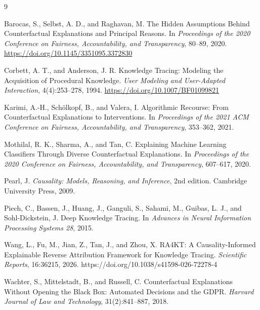 \documentclass[11pt]{article}
\begin{document}
\begin{thebibliography}{9}
\setlength{\itemsep}{4pt}

Barocas, S., Selbst, A. D., and Raghavan, M. The Hidden Assumptions Behind Counterfactual Explanations and Principal Reasons. In \emph{Proceedings of the 2020 Conference on Fairness, Accountability, and Transparency}, 80--89, 2020. \url{https://doi.org/10.1145/3351095.3372830}

Corbett, A. T., and Anderson, J. R. Knowledge Tracing: Modeling the Acquisition of Procedural Knowledge. \emph{User Modeling and User-Adapted Interaction}, 4(4):253--278, 1994. \url{https://doi.org/10.1007/BF01099821}

Karimi, A.-H., Sch\"olkopf, B., and Valera, I. Algorithmic Recourse: From Counterfactual Explanations to Interventions. In \emph{Proceedings of the 2021 ACM Conference on Fairness, Accountability, and Transparency}, 353--362, 2021.

Mothilal, R. K., Sharma, A., and Tan, C. Explaining Machine Learning Classifiers Through Diverse Counterfactual Explanations. In \emph{Proceedings of the 2020 Conference on Fairness, Accountability, and Transparency}, 607--617, 2020.

Pearl, J. \emph{Causality: Models, Reasoning, and Inference}, 2nd edition. Cambridge University Press, 2009.

Piech, C., Bassen, J., Huang, J., Ganguli, S., Sahami, M., Guibas, L. J., and Sohl-Dickstein, J. Deep Knowledge Tracing. In \emph{Advances in Neural Information Processing Systems 28}, 2015.

Wang, L., Fu, M., Jian, Z., Tan, J., and Zhou, X. RA4KT: A Causality-Informed Explainable Reverse Attribution Framework for Knowledge Tracing. \emph{Scientific Reports}, 16:36215, 2026. https://doi.org/10.1038/s41598-026-72278-4

Wachter, S., Mittelstadt, B., and Russell, C. Counterfactual Explanations Without Opening the Black Box: Automated Decisions and the GDPR. \emph{Harvard Journal of Law and Technology}, 31(2):841--887, 2018.

\end{thebibliography}
\end{document}
